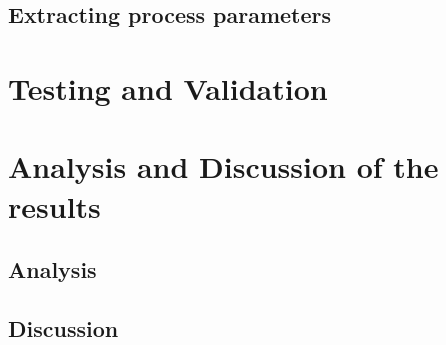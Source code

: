 \subsection{Extracting process parameters}

\section{Testing and Validation}%

\section{Analysis and Discussion of the results}%


\subsection{Analysis}
\subsection{Discussion}%